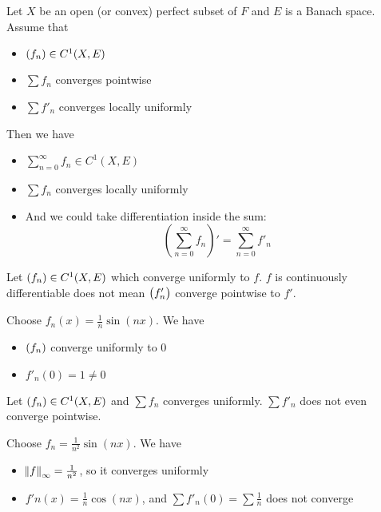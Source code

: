 \begin{theorem}
    Let $X$ be an open (or convex) perfect subset of $F$ and $E$ is a Banach space. Assume that
    \begin{itemize}
        \item $\sequence{f_n} \in C^1(X,E)$
        \item $\sum f_n$ converges pointwise
        \item $\sum f'_n$ converges locally uniformly
    \end{itemize}
    
    Then we have
    \begin{itemize}
        \item $\sum_{n=0}^\infty f_n \in C^1(X,E)$
        \item $\sum f_n$ converges locally uniformly
        \item And we could take differentiation inside the sum: \begin{equation}
        \left( \sum_{n=0}^\infty f_n \right)' = \sum_{n=0}^\infty f'_n
    \end{equation}
    \end{itemize}
\end{theorem}


\begin{example}
    Let $\sequence{f_n} \in C^1(X,E)$ which converge uniformly to $f$. $f$ is continuously differentiable does not mean $\sequence{f'_n}$ converge pointwise to $f'$.
    
    Choose $f_n(x) = \frac{1}{n} \sin (nx)$. We have
    \begin{itemize}
        \item $\sequence{f_n}$ converge uniformly to $0$
        \item $f'_n(0) = 1 \neq 0$
    \end{itemize}
\end{example}

\begin{example}
    Let $\sequence{f_n} \in C^1(X,E)$ and $\sum f_n$ converges uniformly. $\sum f'_n$ does not even converge pointwise.
    
    Choose $f_n = \frac{1}{n^2} \sin (nx)$. We have
    \begin{itemize}
        \item $\norm{f}_\infty = \frac{1}{n^2}$, so it converges uniformly
        \item $f'n(x) = \frac{1}{n} \cos (nx)$, and $\sum f'_n(0) = \sum \frac{1}{n}$ does not converge
    \end{itemize}
\end{example}





